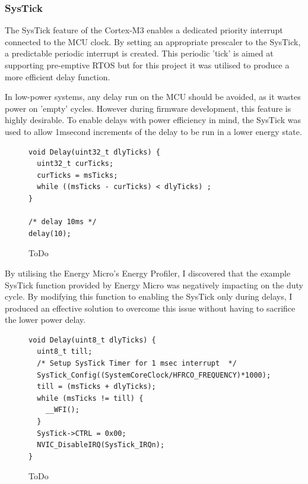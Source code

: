 \subsubsection{SysTick}
The SysTick feature of the Cortex-M3 enables a dedicated priority interrupt connected to the MCU
clock. By setting an appropriate prescaler to the SysTick, a predictable periodic interrupt is created.
This periodic 'tick' is aimed at supporting pre-emptive \ac{RTOS}\cite{RTOS2011} but for this project
it was utilised to produce a more efficient delay function.


In low-power systems, any delay run on the MCU should be avoided, as it wastes power on 'empty'
cycles. However during firmware development, this feature is highly desirable. To enable delays with
power efficiency in mind, the SysTick was used to allow 1msecond increments of the delay to be run
in a lower energy state.

\begin{figure}
  \vspace{-10pt}
  \begin{center}
    \lstset{language=[ANSI]C}
    \begin{lstlisting}
void Delay(uint32_t dlyTicks) {
  uint32_t curTicks;
  curTicks = msTicks;
  while ((msTicks - curTicks) < dlyTicks) ;
}

/* delay 10ms */
delay(10);
    \end{lstlisting}
    \caption[ToDo]{ToDo\cite{EFM32STK}}
  \end{center}
  \vspace{-10pt}
\end{figure}

By utilising the Energy Micro's Energy Profiler, I discovered that the example SysTick function
provided by Energy Micro was negatively impacting on the duty cycle. By modifying this function to
enabling the SysTick only during delays, I produced an effective solution to overcome this issue
without having to sacrifice the lower power delay.


\begin{figure}
  \vspace{-10pt}
  \begin{center}
    \lstset{language=[ANSI]C}
    \begin{lstlisting}
void Delay(uint8_t dlyTicks) {
  uint8_t till;
  /* Setup SysTick Timer for 1 msec interrupt  */
  SysTick_Config((SystemCoreClock/HFRCO_FREQUENCY)*1000);
  till = (msTicks + dlyTicks);
  while (msTicks != till) {
    __WFI();
  }
  SysTick->CTRL = 0x00;
  NVIC_DisableIRQ(SysTick_IRQn);
}
    \end{lstlisting}
    \caption[ToDo]{ToDo\cite{EFM32STK}}
  \end{center}
  \vspace{-10pt}
\end{figure}

